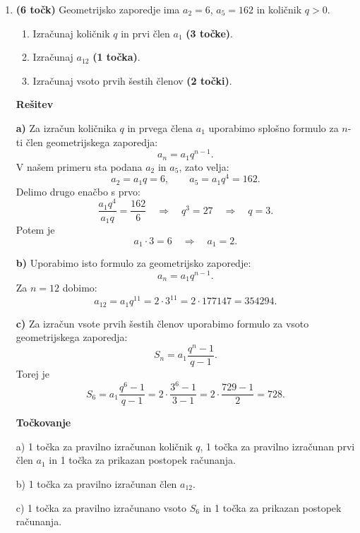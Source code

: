 \documentclass[a4paper,12pt]{article}
\begin{document}
\begin{enumerate}
 \medskip

 b) 1 točka za pravilno izračunan člen $a_{25}$.

 \medskip

 c) 1 točka za pravilno izračunano vsoto $S_{25}$ in 1 točka za prikazan postopek računanja.


\vspace{1em}
\clearpage
\item \textbf{(6 točk)} Geometrijsko zaporedje ima $a_2=6$, $a_5=162$ in količnik $q>0$.
\begin{enumerate}[label=\alph*)]
  \item Izračunaj količnik $q$ in prvi člen $a_1$ \textbf{(3 točke)}.
  \item Izračunaj $a_{12}$ \textbf{(1 točka)}.
  \item Izračunaj vsoto prvih šestih členov \textbf{(2 točki)}.
\end{enumerate}

\vspace{0.5em}

\textbf{\large Rešitev}

\textbf{a)}
Za izračun količnika $q$ in prvega člena $a_1$ uporabimo splošno formulo za $n$-ti člen geometrijskega zaporedja:
\[
 a_n=a_1q^{n-1}.
\]
V našem primeru sta podana $a_2$ in $a_5$, zato velja:
\[
 a_2=a_1q=6,
\qquad
 a_5=a_1q^4=162.
\]
Delimo drugo enačbo s prvo:
\[
\frac{a_1q^4}{a_1q}=\frac{162}{6}
\quad\Rightarrow\quad
q^3=27
\quad\Rightarrow\quad
q=3.
\]
Potem je
\[
 a_1\cdot 3=6
\quad\Rightarrow\quad
 a_1=2.
\]

\textbf{b)}
Uporabimo isto formulo za geometrijsko zaporedje:
\[
 a_n=a_1q^{n-1}.
\]
Za $n=12$ dobimo:
\[
 a_{12}=a_1q^{11}=2\cdot 3^{11}=2\cdot 177147=354294.
\]

\textbf{c)}
Za izračun vsote prvih šestih členov uporabimo formulo za vsoto geometrijskega zaporedja:
\[
 S_n=a_1\frac{q^n-1}{q-1}.
\]
Torej je
\[
 S_6=a_1\dfrac{q^6-1}{q-1}=2\cdot\dfrac{3^6-1}{3-1}=2\cdot\dfrac{729-1}{2}=728.
\]

\vspace{0.5em}
\textbf{\large Točkovanje}

 a) 1 točka za pravilno izračunan količnik $q$, 1 točka za pravilno izračunan prvi člen $a_1$ in 1 točka za prikazan postopek računanja.

 \medskip

 b) 1 točka za pravilno izračunan člen $a_{12}$.

 \medskip

 c) 1 točka za pravilno izračunano vsoto $S_6$ in 1 točka za prikazan postopek računanja.


\end{enumerate}
\end{document}
